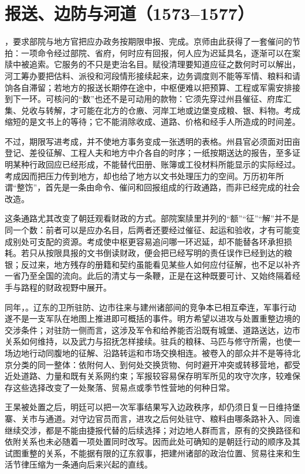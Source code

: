 \section{报送、边防与河道（1573--1577）}

，要求部院与地方官把应办政务按期限申报、完成。京师由此获得了一套催问的节拍：一项命令经过部院、省府，何时应有回报，何人应为迟延具名，逐渐可以在案牍中被追索。它服务的不只是吏治名目。赋役清理要知道应征之数何时可以解出，河工筹办要把估料、派役和河段情形接续起来，边务调度则不能等军情、粮料和请饷各自滞留；若地方的报送长期停在途中，中枢便难以把预算、工程或军需安排接到下一环。可核问的“数”也还不是可动用的款物：它须先穿过州县催征、府库汇集、兑收与转解，才可能在北方的仓廒、河岸工地或边堡变成粮、银、料物。考成缩短的是文书上的等待；它不能消除收成、道路、价格和经手人所造成的时间差。

不过，期限写进考成，并不使地方事务变成一张透明的表格。州县官必须面对田亩登记、差役征解、工程人夫和地方中介各自的时序；一纸按期送达的报告，至多证明某种行政回应已经形成，不能替代田册、账簿或工役材料所能显示的实际经过。考成因而把压力传到地方，却也给了地方以文书处理压力的空间。万历初年所谓“整饬”，首先是一条由命令、催问和回报组成的行政通路，而非已经完成的社会改造。

这条通路尤其改变了朝廷观看财政的方式。部院案牍里并列的“额”“征”“解”并不是同一个数：前者可以是应办名目，后两者还要经过催征、起运和验收，才有可能变成别处可支配的资源。考成使中枢更容易追问哪一环迟延，却不能替各环承担损耗。若只从按限具报的文书倒读财政，便会把已经写明的责任误作已经到达的粮银；反过来，地方残存的册籍和契约虽能看见某些人如何应付征解，也不足以补齐一省乃至全国的流向。此后的清丈与一条鞭，正是在这种既要可计、又始终隔着经手与路程的财政视野中展开。

同年，。辽东的卫所驻防、边市往来与建州诸部间的竞争本已相互牵连，军事行动遂不是一支军队在地图上推进即可概括的事件。明方希望以进攻与处置重整边境的交涉条件；对驻防一侧而言，这涉及军令和给养能否沿既有城堡、道路送达，边市关系如何维持，以及武力与招抚怎样接续。驻兵的粮秣、马匹与修守所需，也使一场边地行动同腹地的征解、沿路转运和市场交换相连。被卷入的部众并不是等待北京分类的同一整体：依附何人、到何处交换货物、何时避开冲突或转移营地，都受近处道路、力量和既有关系网约束；军报较容易保存明军所见的攻守次序，较难保存这些选择改变了一处聚落、贸易点或季节性营地的何种日常。

王杲被处置之后，明廷可以把一次军事结果写入边政秩序，却仍须日复一日维持堡寨、关市与通道。对守边官员而言，进攻之后何处驻守、粮料由哪条路补入、同谁继续交涉，都是不能由捷报代替的后续选择；对边地人群而言，原有的交换路径和依附关系也未必随着一项处置同时改写。因而此处可确知的是朝廷行动的顺序及其试图重整的关系，不能据有限的辽东叙事，把建州诸部的政治位置、贸易往来和生活节律压缩为一条通向后来兴起的直线。

